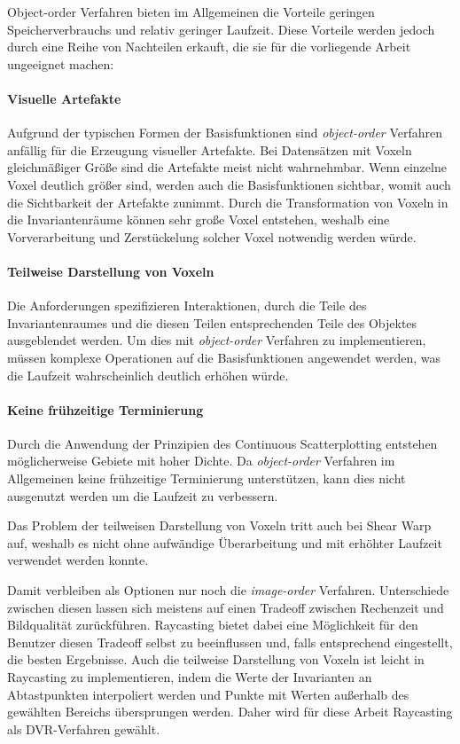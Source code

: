 \documentclass[a4paper,fontsize=12pt,toc=bib,parskip=half,ngerman]{scrartcl}
\begin{document}
Object-order Verfahren bieten im Allgemeinen die Vorteile geringen Speicherverbrauchs und relativ geringer Laufzeit. Diese Vorteile werden jedoch durch eine Reihe von Nachteilen erkauft, die sie f\"ur die vorliegende Arbeit ungeeignet machen:


\paragraph{Visuelle Artefakte} Aufgrund der typischen Formen der Basisfunktionen sind \textit{object-order} Verfahren anf\"allig f\"ur die Erzeugung visueller Artefakte. Bei Datens\"atzen mit Voxeln gleichm\"a{\ss}iger Gr\"o{\ss}e sind die Artefakte meist nicht wahrnehmbar. Wenn einzelne Voxel deutlich gr\"o{\ss}er sind, werden auch die Basisfunktionen sichtbar, womit auch die Sichtbarkeit der Artefakte zunimmt. Durch die Transformation von Voxeln in die Invariantenr\"aume k\"onnen sehr gro{\ss}e Voxel entstehen, weshalb eine Vorverarbeitung und Zerst\"uckelung solcher Voxel notwendig werden w\"urde.

\paragraph{Teilweise Darstellung von Voxeln} Die Anforderungen spezifizieren Interaktionen, durch die Teile des Invariantenraumes und die diesen Teilen entsprechenden Teile des Objektes ausgeblendet werden. Um dies mit \textit{object-order} Verfahren zu implementieren, m\"ussen komplexe Operationen auf die Basisfunktionen angewendet werden, was die Laufzeit wahrscheinlich deutlich erh\"ohen w\"urde.

\paragraph{Keine fr\"uhzeitige Terminierung} Durch die Anwendung der Prinzipien des Continuous Scatterplotting entstehen m\"oglicherweise Gebiete mit hoher Dichte. Da \textit{object-order} Verfahren im Allgemeinen keine fr\"uhzeitige Terminierung unterst\"utzen, kann dies nicht ausgenutzt werden um die Laufzeit zu verbessern.

Das Problem der teilweisen Darstellung von Voxeln tritt auch bei Shear Warp auf, weshalb es nicht ohne aufw\"andige \"Uberarbeitung und mit erh\"ohter Laufzeit verwendet werden konnte.

Damit verbleiben als Optionen nur noch die \textit{image-order} Verfahren. Unterschiede zwischen diesen lassen sich meistens auf einen Tradeoff zwischen Rechenzeit und Bildqualit\"at zur\"uckf\"uhren. Raycasting bietet dabei eine M\"oglichkeit f\"ur den Benutzer diesen Tradeoff selbst zu beeinflussen und, falls entsprechend eingestellt, die besten Ergebnisse. Auch die teilweise Darstellung von Voxeln ist leicht in Raycasting zu implementieren, indem die Werte der Invarianten an Abtastpunkten interpoliert werden und Punkte mit Werten au{\ss}erhalb des gew\"ahlten Bereichs \"ubersprungen werden. Daher wird f\"ur diese Arbeit Raycasting als DVR-Verfahren gew\"ahlt.
\end{document}
